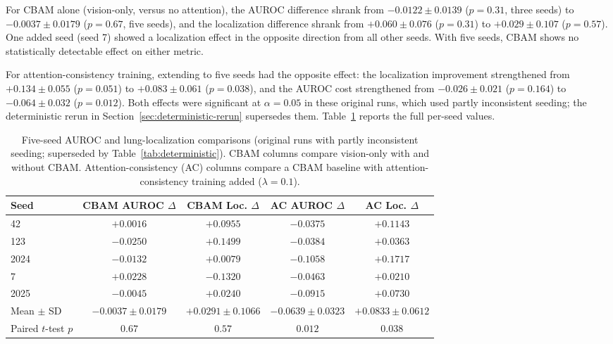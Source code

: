 For CBAM alone (vision-only, versus no attention), the AUROC difference
shrank from $-0.0122 \pm 0.0139$ ($p=0.31$, three seeds) to
$-0.0037 \pm 0.0179$ ($p=0.67$, five seeds), and the localization
difference shrank from $+0.060 \pm 0.076$ ($p=0.31$) to
$+0.029 \pm 0.107$ ($p=0.57$). One added seed (seed 7) showed a
localization effect in the opposite direction from all other seeds. With
five seeds, CBAM shows no statistically detectable effect on either metric.

For attention-consistency training, extending to five seeds had the
opposite effect: the localization improvement strengthened from
$+0.134 \pm 0.055$ ($p=0.051$) to $+0.083 \pm 0.061$ ($p=0.038$), and the
AUROC cost strengthened from $-0.026 \pm 0.021$ ($p=0.164$) to
$-0.064 \pm 0.032$ ($p=0.012$). Both effects were significant at $\alpha=0.05$
in these original runs, which used partly inconsistent seeding; the
deterministic rerun in Section~\ref{sec:deterministic-rerun} supersedes them.
Table~\ref{tab:five-seed} reports the full per-seed values.

\begin{table}[htbp]
\centering
\caption{Five-seed AUROC and lung-localization comparisons (original runs with
partly inconsistent seeding; superseded by Table~\ref{tab:deterministic}). CBAM columns
compare vision-only with and without CBAM. Attention-consistency (AC)
columns compare a CBAM baseline with attention-consistency training added
($\lambda=0.1$).}
\label{tab:five-seed}
\small
\begin{tabular}{lcccc}
\toprule
Seed & CBAM AUROC $\Delta$ & CBAM Loc. $\Delta$ & AC AUROC $\Delta$ & AC Loc. $\Delta$ \\
\midrule
42   & $+0.0016$ & $+0.0955$ & $-0.0375$ & $+0.1143$ \\
123  & $-0.0250$ & $+0.1499$ & $-0.0384$ & $+0.0363$ \\
2024 & $-0.0132$ & $+0.0079$ & $-0.1058$ & $+0.1717$ \\
7    & $+0.0228$ & $-0.1320$ & $-0.0463$ & $+0.0210$ \\
2025 & $-0.0045$ & $+0.0240$ & $-0.0915$ & $+0.0730$ \\
\midrule
Mean $\pm$ SD & $-0.0037 \pm 0.0179$ & $+0.0291 \pm 0.1066$ & $-0.0639 \pm 0.0323$ & $+0.0833 \pm 0.0612$ \\
Paired $t$-test $p$ & $0.67$ & $0.57$ & $0.012$ & $0.038$ \\
\bottomrule
\end{tabular}
\end{table}

